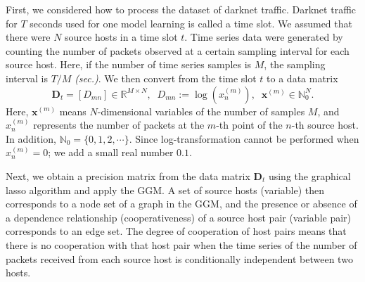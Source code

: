 \documentclass[conference]{IEEEtran}
\begin{document}
First, we considered how to process the dataset of darknet traffic.
Darknet traffic for $T$ seconds used for one model learning is called a time slot.
We assumed that there were $N$ source hosts in a time slot $t$.
Time series data were generated by counting the number of packets observed at a certain sampling interval for each source host.
Here, if the number of time series samples is $M$, the sampling interval is $T/M$ \textit{(sec.)}.
We then convert from the time slot $t$ to a data matrix
\begin{equation*}
\bm{D}_t=[D_{mn}]\in\mathbb{R}^{M \times N},
\;\;D_{mn} := \log(x_n^{(m)}),
\;\;\bm{x}^{(m)}\in\mathbb{N}_0^{N}.
\end{equation*}
Here, $\bm{x}^{(m)}$ means $N$-dimensional variables of the number of samples $M$, and $x_n^{(m)}$ represents the number of packets at the $m$-th point of the $n$-th source host.
In addition, $\mathbb{N}_0=\{0,1,2,\cdots\}$.
Since log-transformation cannot be performed when $x_n^{(m)}=0$; we add a small real number $0.1$.

Next, we obtain a precision matrix from the data matrix $\bm{D}_t$ using the graphical lasso algorithm and apply the GGM.
A set of source hosts (variable) then corresponds to a node set of a graph in the GGM, and the presence or absence of a dependence relationship (cooperativeness) of a source host pair (variable pair) corresponds to an edge set.
The degree of cooperation of host pairs means that there is no cooperation with that host pair when the time series of the number of packets received from each source host is conditionally independent between two hosts.
\end{document}
